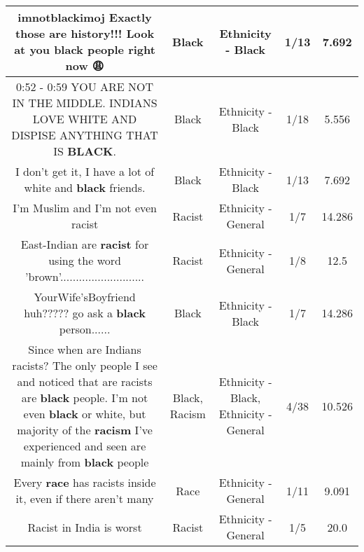 \documentclass[11pt]{article}
\newlength\mylength
\begin{document}
\begin{center}
\begin{longtable}{|C{.65\mylength}|C{.30\mylength}|C{.12\mylength}|C{.12\mylength}|C{.12\mylength}|}
  \small imnotblackimoj Exactly those are history!!! Look at you \textbf{black} people right now 😩\normalsize   & Black & Ethnicity - Black & 1/13 & 7.692 \\  \hline
  \small 0:52 -  0:59 YOU ARE NOT IN THE MIDDLE. INDIANS LOVE WHITE AND DISPISE ANYTHING THAT IS \textbf{BLACK}.\normalsize   & Black & Ethnicity - Black & 1/18 & 5.556 \\  \hline
  \small I don't get it, I have a lot of white and \textbf{black} friends.\normalsize   & Black & Ethnicity - Black & 1/13 & 7.692 \\  \hline
  \small I'm Muslim and I'm not even racist\normalsize   & Racist & Ethnicity - General & 1/7 & 14.286 \\  \hline
  \small East-Indian are \textbf{racist} for using the word 'brown'...........................\normalsize   & Racist & Ethnicity - General & 1/8 & 12.5 \\  \hline
  \small YourWife'sBoyfriend huh????? go ask a \textbf{black} person......\normalsize   & Black & Ethnicity - Black & 1/7 & 14.286 \\  \hline
  \small Since when are Indians racists? The only people I see and noticed that are racists are \textbf{black} people. I'm not even \textbf{black} or white, but majority of the \textbf{racism} I've experienced and seen are mainly from \textbf{black} people\normalsize   & Black, Racism & Ethnicity - Black, Ethnicity - General & 4/38 & 10.526 \\  \hline
  \small Every \textbf{race} has racists inside it, even if there aren't many\normalsize   & Race & Ethnicity - General & 1/11 & 9.091 \\  \hline
  \small Racist in India is worst\normalsize   & Racist & Ethnicity - General & 1/5 & 20.0 \\  \hline

\end{longtable}
\end{center}
\end{document}
